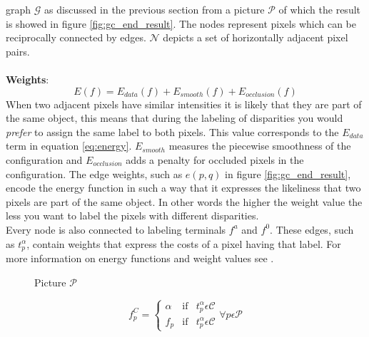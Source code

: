 \documentclass[a4paper]{article}
\begin{document}
graph $\mathcal{G}$ as discussed in the previous section from a
picture $\mathcal{P}$ of which the result is showed in figure \ref{fig:gc_end_result}.
The nodes represent pixels which can be reciprocally connected by edges.  $\mathcal{N}$ depicts a set of horizontally
adjacent pixel pairs.\\\\
\noindent\textbf{Weights}:\indent\\
\begin{equation}
 E(f) = E_{data}(f) + E_{smooth}(f) + E_{occlusion}(f)
\label{eq:energy}
\end{equation}
When two adjacent pixels have similar intensities it is likely that
they are part of the same object, this means that during the labeling
of disparities you would \emph{prefer} to assign the same label to
both pixels. This value corresponds to the $E_{data}$ term in equation \ref{eq:energy}.
$E_{smooth}$ measures the piecewise smoothness of the configuration and $E_{occlusion}$ 
adds a penalty for occluded pixels in the configuration.
The edge weights, such as $e(p,q)$ in figure \ref{fig:gc_end_result}, encode the energy function in such a way that it expresses
the likeliness that two pixels are part of the same object. In other words the higher the weight value 
the less you want to label the pixels with different disparities.\\
Every node is also connected to labeling terminals $f^a$ and $f^0$. These edges, such as $t^{\alpha}_{p}$, contain weights that 
express the costs of a pixel having that label. For more information on energy functions and weight values see \cite{zabih2001}.

\begin{figure}[h!bt]
\centering
\caption{Picture $\mathcal{P}$}
\begin{minipage}[h]{.4\linewidth}

\end{minipage}
\hspace{.1\linewidth}
\begin{minipage}[h]{.4\linewidth}

\end{minipage}
\end{figure}
\begin{equation}
 f_{p}^{C} = \left\{
  \begin{array}{lll}
  \alpha & \text{if} & t^{\alpha}_{p} \epsilon \mathcal{C} \\ 
  f_{p}  & \text{if} & t^{\alpha}_{p} \epsilon \mathcal{C}
  \end{array}
\right.
 \forall p \epsilon \mathcal{P}
\end{equation}
\end{document}
